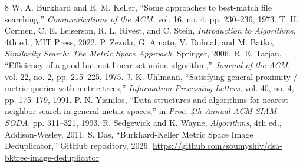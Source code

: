 \documentclass[11pt,a4paper]{article}
\begin{document}
\begin{thebibliography}{8}
 W. A. Burkhard and R. M. Keller, ``Some approaches to best-match file searching,'' \textit{Communications of the ACM}, vol. 16, no. 4, pp. 230--236, 1973.
 T. H. Cormen, C. E. Leiserson, R. L. Rivest, and C. Stein, \textit{Introduction to Algorithms}, 4th ed., MIT Press, 2022.
 P. Zezula, G. Amato, V. Dohnal, and M. Batko, \textit{Similarity Search: The Metric Space Approach}, Springer, 2006.
 R. E. Tarjan, ``Efficiency of a good but not linear set union algorithm,'' \textit{Journal of the ACM}, vol. 22, no. 2, pp. 215--225, 1975.
 J. K. Uhlmann, ``Satisfying general proximity / metric queries with metric trees,'' \textit{Information Processing Letters}, vol. 40, no. 4, pp. 175--179, 1991.
 P. N. Yianilos, ``Data structures and algorithms for nearest neighbor search in general metric spaces,'' in \textit{Proc. 4th Annual ACM-SIAM SODA}, pp. 311--321, 1993.
 R. Sedgewick and K. Wayne, \textit{Algorithms}, 4th ed., Addison-Wesley, 2011.
 S. Das, ``Burkhard-Keller Metric Space Image Deduplicator,'' GitHub repository, 2026. \url{https://github.com/soumyshiv/dsa-bktree-image-deduplicator}
\end{thebibliography}
\end{document}

